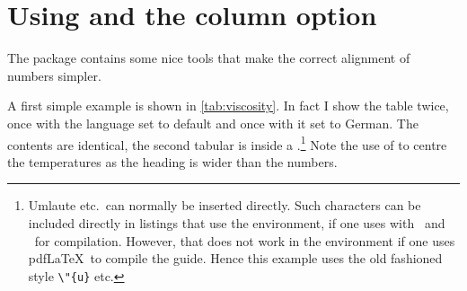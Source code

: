 \section{Using  and the  column option}%
\label{sec:table:siunitx}

The  package contains some nice tools that make the
correct alignment of numbers simpler. 

A first simple example is shown in \cref{tab:viscosity}.
In fact I show the table twice, once
with the language set to default and once with it set to German. The
 contents are identical, the second tabular is inside a
.\footnote{%
Umlaute etc.\ can normally be inserted directly.
Such characters can be included directly in listings that use the  environment,
if one uses  with \LuaLaTeX\ and \XeLaTeX\ for compilation.
However, that does not work in the  environment if one uses pdf\LaTeX\ to compile the guide.
Hence this example uses the old fashioned style 
\texttt{\textbackslash"\{u\}} etc.}
Note the use of 
to centre the temperatures as the heading is wider than the numbers.

